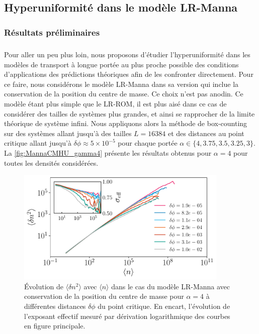 \subsection{Hyperuniformité dans le modèle LR-Manna}

\subsubsection{Résultats préliminaires}

\subparagraph{}Pour aller un peu plus loin, nous proposons d'étudier l'hyperuniformité dans les modèles de transport à longue portée au plus proche possible des conditions d'applications des prédictions théoriques afin de les confronter directement. Pour ce faire, nous considérons le modèle LR-Manna dans sa version qui inclue la conservation de la position du centre de masse. Ce choix n'est pas anodin. Ce modèle étant plus simple que le LR-ROM, il est plus aisé dans ce cas de considérer des tailles de systèmes plus grandes, et ainsi se rapprocher de la limite théorique de système infini. Nous appliquons alors la méthode de box-counting sur des systèmes allant jusqu'à des tailles $L=16384$ et des distances au point critique allant jusqu'à $\delta\phi \approx 5\times 10^{-5}$ pour chaque portée $\alpha\in\{ 4, 3.75, 3.5, 3.25, 3 \}$. La \autoref{fig:MannaCMHU_gamma4} présente les résultats obtenus pour $\alpha = 4$ pour toutes les densités considérées.

\begin{figure}[h]
	\centering
	\includegraphics[width=0.9\textwidth]{Chapitre2/Figures/Hyperuniformity/MannaCM_gamma4_results.pdf}
	\caption{Évolution de $\langle \delta n^2 \rangle$ avec $\langle n \rangle$ dans le cas du modèle LR-Manna avec conservation de la position du centre de masse pour $\alpha=4$ à différentes distances $\delta\phi$ du point critique. En encart, l'évolution de l'exposant effectif mesuré par dérivation logarithmique des courbes en figure principale.}
	\label{fig:MannaCMHU_gamma4}
\end{figure}


